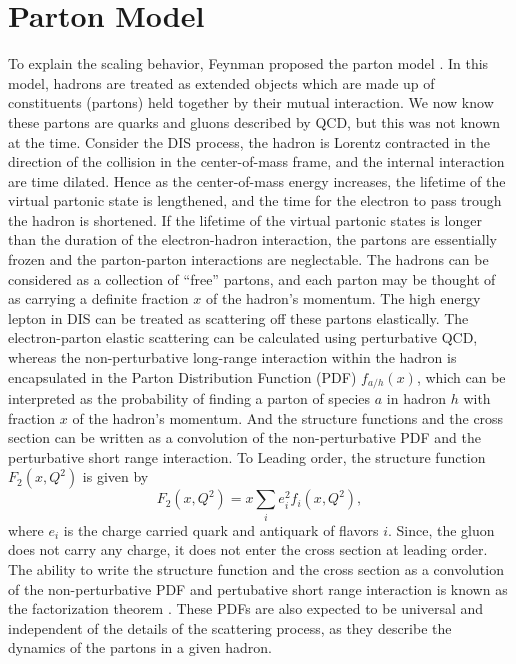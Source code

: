 \documentclass[../main.tex]{subfiles}
\begin{document}
\section{Parton Model}
\label{sec:parton}
To explain the scaling behavior, Feynman proposed the parton model \cite{feynman1969}.
In this model, hadrons are treated as extended objects which are made up of
constituents (partons) held together by their mutual interaction. We now know
these partons are quarks and gluons described by QCD, but this was not known at
the time. Consider the DIS process, the hadron is Lorentz contracted in the
direction of the collision in the center-of-mass frame, and the internal
interaction are time dilated. Hence as the center-of-mass energy increases, the
lifetime of the virtual partonic state is lengthened, and the time for the
electron to pass trough the hadron is shortened. If the lifetime of the virtual
partonic states is longer than the duration of the electron-hadron interaction,
the partons are essentially frozen and the parton-parton interactions are
neglectable. The hadrons can be considered as a collection of ``free'' partons,
and each parton may be thought of as carrying a definite fraction $x$ of the
hadron's momentum. The high energy lepton in DIS can be treated as scattering
off these partons elastically. The electron-parton elastic scattering can be
calculated using perturbative QCD, whereas the non-perturbative long-range
interaction within the hadron is encapsulated in the Parton Distribution
Function (PDF) $f_{a/h}\left(x\right)$, which can be interpreted as the probability
of finding a parton of species $a$ in hadron $h$ with fraction $x$ of the hadron's momentum.
And the structure functions and the cross section can be written as a convolution
of the non-perturbative PDF and the perturbative short range interaction. To Leading
order, the structure function $F_2\left(x,Q^2\right)$ is given by
\begin{equation}
	F_2\left(x,Q^2\right)=x\sum_i e^2_i f_i\left(x,Q^2\right),
	\label{eq:F2_parton}
\end{equation}
where $e_i$ is the charge carried quark and antiquark of flavors $i$. Since, the
gluon does not carry any charge, it does not enter the cross section at leading
order. The ability to write the structure function and the cross section as a
convolution of the non-perturbative PDF and pertubative short range interaction
is known as the factorization theorem \cite{collins1989}. These PDFs are also
expected to be universal and independent of the details of the scattering
process, as they describe the dynamics of the partons in a given hadron.
\end{document}
